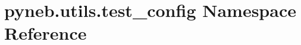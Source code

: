 \hypertarget{namespacepyneb_1_1utils_1_1test__config}{}\section{pyneb.\+utils.\+test\+\_\+config Namespace Reference}
\label{namespacepyneb_1_1utils_1_1test__config}

